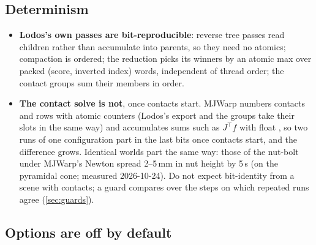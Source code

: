 \subsection{Determinism}\label{sec:determinism}

\begin{itemize}
\item \textbf{Lodos's own passes are bit-reproducible}: reverse tree passes read children rather than accumulate into parents, so they need no atomics; compaction is ordered; the reduction picks its winners by an atomic max over packed (score, inverted index) words, independent of thread order; the contact groups sum their members in order.
\item \textbf{The contact solve is not}, once contacts start. MJWarp numbers contacts and rows with atomic counters (Lodos's export and the groups take their slots in  the same way) and accumulates sums such as $J^\top f$ with float , so two runs of one configuration part in the last bits once contacts start, and the difference grows. Identical worlds part the same way: those of the nut-bolt under MJWarp's Newton spread 2--5\,mm in nut height by 5\,s (on the pyramidal cone; measured 2026-10-24). Do not expect bit-identity from a scene with contacts; a guard compares over the steps on which repeated runs agree (\cref{sec:guards}).
\end{itemize}

\subsection{Options are off by default}\label{sec:defaults}


